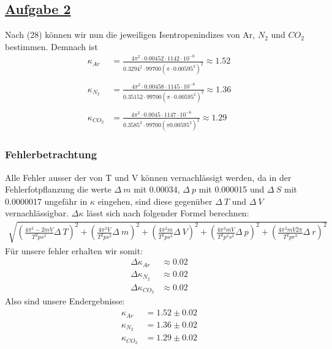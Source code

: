 \documentclass[11pt,a4paper]{article}
\begin{document}
\subsection{\underline{Aufgabe 2}}
 Nach (28) k\"onnen wir nun die jeweiligen Isentropenindizes von Ar, $N_{2}$ und $CO_{2}$
 bestimmen. Demnach ist 
 \begin{align*}
     {\kappa}_{Ar} &=\frac{4{\pi}^{2}\cdot0.00452\cdot1142\cdot{10}^{-6}}
     {{0.3294}^{2}\cdot99700{(\pi\cdot{0.00595}^{2})}^{2}} \approx 1.52 \\ \\
     {\kappa}_{{N}_{2}} &= \frac{4{\pi}^{2}\cdot0.00458\cdot1145\cdot{10}^{-6}}
     {{0.3515}{2}\cdot99700{(\pi\cdot{0.00595}^{2})}^{2}} \approx 1.36 \\ \\
     {\kappa}_{{CO}_{2}} &= \frac{4{\pi}^{2}\cdot0.0045\cdot1147\cdot{10}^{-6}}
     {{0.3585}^{2}\cdot99700{(\pi{0.00595}^{2})}^{2}} \approx 1.29
 \end{align*}
 \subsubsection{Fehlerbetrachtung}
 Alle Fehler ausser der von T und V k\"onnen vernachl\"assigt werden,
 da in der Fehlerfotpflanzung die werte $\Delta~m$ mit 0.00034, $\Delta~p$ mit 0.000015
 und $\Delta~S$ mit 0.0000017 ungef\"ahr in $\kappa$ eingehen, sind diese gegen\"uber
 $\Delta~T$ und $\Delta~V$ vernachl\"assigbar.
 $\Delta\kappa$ l\"asst sich nach folgender Formel berechnen:
 \begin{align*}
    \sqrt{
            {\left(
              \frac{4{\pi}^{2}-2mV}{{T}^{2}p{s}^{2}}\Delta~T
            \right)}^{2}+
            {\left(
              \frac{4{\pi}^{2}V}{{T}^{2}p{s}^{2}}\Delta~m
            \right)}^{2}+
            {\left(
              \frac{4{\pi}^{2}m}{{T}^{2}p{s}^{2}}\Delta~V
            \right)}^{2}+
            {\left(
              \frac{4{\pi}^{2}mV}{{T}^{2}{p}^{2}{s}^{2}}\Delta~p
            \right)}^{2}+
            {\left(
              \frac{4{\pi}^{2}mV2\pi}{{T}^{2}p{r}^{3}}\Delta~r
            \right)}^{2}
        }
 \end{align*}
 F\"ur unsere fehler erhalten wir somit:
 \begin{align*}
     \Delta{\kappa}_{Ar} &\approx 0.02 \\
     \Delta{\kappa}_{{N}_{2}} &\approx 0.02 \\ 
     \Delta{\kappa}_{{CO}_{2}} &\approx 0.02
 \end{align*}
 Also sind unsere Endergebnisse:
 \begin{align*}
     {\kappa}_{Ar} &= 1.52 \pm 0.02 \\
     {\kappa}_{{N}_{2}} &= 1.36 \pm 0.02 \\
     {\kappa}_{{CO}_{2}} &= 1.29 \pm 0.02
 \end{align*}
\end{document}
